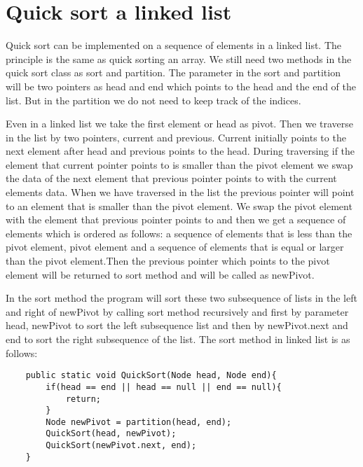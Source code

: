 \documentclass[a4paper,11pt]{article}
\begin{document}
 \section*{Quick sort a linked list}
Quick sort can be implemented on a sequence of elements in a linked list. The principle is the same as quick sorting an array. We still need two methods in the quick sort class as sort and partition. The parameter in the sort and partition will be two pointers as head and end which points to the head and the end of the list. But in the partition we do not need to keep track of the indices. \newline

 Even in a linked list we take the first element or head as pivot. Then we traverse in the list by two pointers, current and previous. Current initially points to the next element after head and previous points to the head. During traversing if the element that current pointer points to is smaller than the pivot element we swap the data of the next element that previous pointer points to with the current elements data. When we have traversed in the list the previous pointer will point to an element that is smaller than the pivot element. We swap the pivot element with the element that previous pointer points to and then we get a sequence of elements which is ordered as follows: a sequence of elements that is less than the pivot element, pivot element and a sequence of elements that is equal or larger than the pivot element.Then the previous pointer which points to the pivot element will be returned to sort method and will be called as newPivot.  \newline

In the sort method the program will sort these two subsequence of lists in the left and right of newPivot by calling sort method recursively and first by parameter head, newPivot to sort the left subsequence list and then by newPivot.next and end to sort the right subsequence of the list. The sort method in linked list is as follows:


  \begin{verbatim}
    public static void QuickSort(Node head, Node end){
        if(head == end || head == null || end == null){
            return;
        }
        Node newPivot = partition(head, end);
        QuickSort(head, newPivot);
        QuickSort(newPivot.next, end);
    }
    \end{verbatim}  
 
 
\end{document}
